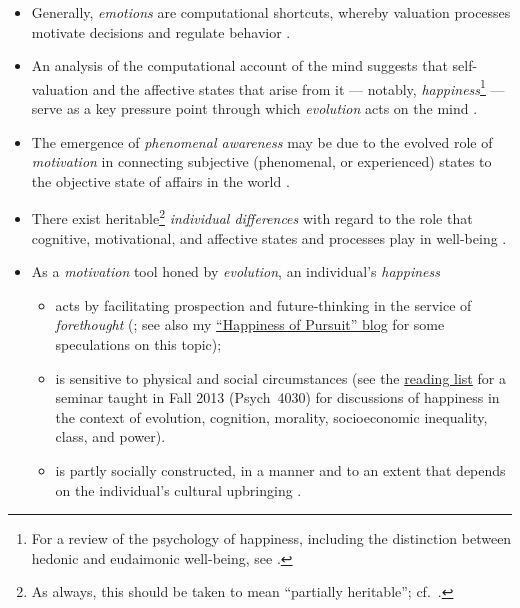 \documentclass[11pt]{article}
\begin{document}
\begin{itemize}

\item Generally, \emph{emotions} are computational shortcuts, whereby
  valuation processes motivate decisions and regulate behavior
  \citep{Rogers63,Minsky06}.

\item An analysis of the computational account of the mind
  \citep{Edelman12thop} suggests that self-valuation and the affective
  states that arise from it --- notably, \emph{happiness}\footnote{For
    a review of the psychology of happiness, including the distinction
    between hedonic and eudaimonic well-being, see
    \citep{RyanDeci01}.} --- serve as a key pressure point through
  which \emph{evolution} acts on the mind
  \citep{Geary05,NovareseEtAl09}.

\item The emergence of \emph{phenomenal awareness} may be due to the
  evolved role of \emph{motivation} in connecting subjective
  (phenomenal, or experienced) states to the objective state of
  affairs in the world \citep{Cleeremans08,GinsburgJablonka10}.

\item There exist heritable\footnote{As always, this should be taken
  to mean ``partially heritable''; cf.\ \citep{JablonkaLamb07}.}
  \emph{individual differences} with regard to the role that
  cognitive, motivational, and affective states and processes play in
  well-being \citep{ChenEtAl99DRD4,Lyubomirsky01}.

\item As a \emph{motivation} tool honed by \emph{evolution}, an
  individual's \emph{happiness}

  \begin{itemize}

  \item acts by facilitating prospection and future-thinking in the
    service of \emph{forethought} (\citealp*{Edelman12thop}; see also
    my
    \href{http://www.psychologytoday.com/blog/the-happiness-pursuit}{``Happiness
      of Pursuit'' blog} for some speculations on this topic);

  \item is sensitive to physical and social circumstances (see the
    \href{http://kybele.psych.cornell.edu/~edelman/Psych-4030/schedule.html}{reading
      list} for a seminar taught in Fall 2013 (Psych~4030) for
    discussions of happiness in the context of evolution, cognition,
    morality, socioeconomic inequality, class, and power).

  \item is partly socially constructed, in a manner and to an extent
    that depends on the individual's cultural upbringing
    \citep{UchidaOgihara12}.

\end{itemize}

\end{itemize}
\end{document}
